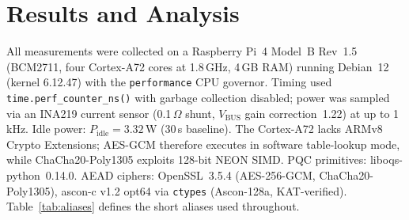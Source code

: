 
\section{Results and Analysis}
\label{sec:results}

All measurements were collected on a Raspberry Pi~4 Model~B Rev~1.5
(BCM2711, four Cortex-A72 cores at 1.8\,GHz, 4\,GB RAM) running
Debian~12 (kernel 6.12.47) with the \texttt{performance} CPU governor.
Timing used \texttt{time.perf\_counter\_ns()} with garbage collection
disabled; power was sampled via an INA219 current sensor
(0.1\,$\Omega$ shunt, $V_\text{BUS}$ gain correction~1.22) at up
to 1\,kHz.  Idle power: $P_\text{idle} = 3.32$\,W (30\,s baseline).
The Cortex-A72 lacks ARMv8 Crypto Extensions; AES-GCM therefore
executes in software table-lookup mode, while ChaCha20-Poly1305
exploits 128-bit NEON SIMD.
PQC primitives: liboqs-python~0.14.0.
AEAD ciphers: OpenSSL~3.5.4 (AES-256-GCM, ChaCha20-Poly1305),
ascon-c v1.2 opt64 via \texttt{ctypes} (Ascon-128a, KAT-verified).
Table~\ref{tab:aliases} defines the short aliases used throughout.

